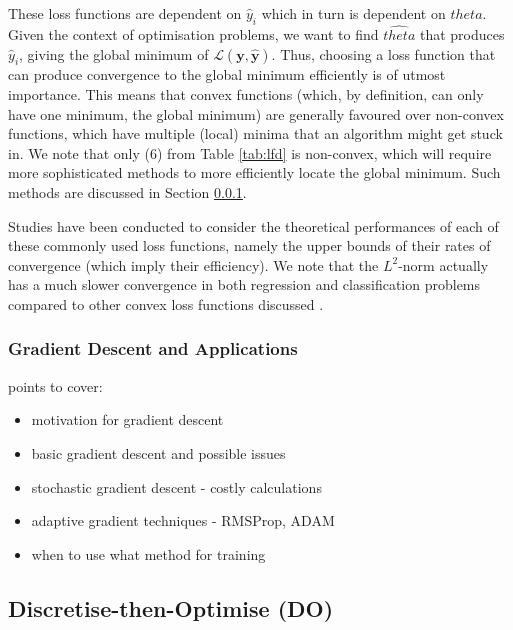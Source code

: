 \documentclass[a4paper,11pt,titlepage]{article}
\def\theta{theta}%
\theoremstyle{definition}
\theoremstyle{plain}
\theoremstyle{remark}
\begin{document}
These loss functions are dependent on $\hat{y}_i$ which in turn is dependent on $\theta$. Given the context of optimisation problems, we want to find $\hat{\theta}$ that produces $\hat{y}_i$, giving the global minimum of $\mathcal{L}(\mathbf{y}, \mathbf{\hat{y}})$. Thus, choosing a loss function that can produce convergence to the global minimum efficiently is of utmost importance. This means that convex functions (which, by definition, can only have one minimum, the global minimum) are generally favoured over non-convex functions, which have multiple (local) minima that an algorithm might get stuck in. We note that only (6) from Table \ref{tab:lfd} is non-convex, which will require more sophisticated methods to more efficiently locate the global minimum. Such methods are discussed in Section \ref{sec:gd}.

Studies have been conducted to consider the theoretical performances of each of these commonly used loss functions, namely the upper bounds of their rates of convergence (which imply their efficiency). We note that the $L^2$-norm actually has a much slower convergence in both regression and classification problems compared to other convex loss functions discussed \cite{Rosasco2004}.

\subsubsection{Gradient Descent and Applications}
\label{sec:gd}

points to cover:
\begin{itemize}
    \item motivation for gradient descent
    \item basic gradient descent and possible issues
    \item stochastic gradient descent - costly calculations
    \item adaptive gradient techniques - RMSProp, ADAM
    \item when to use what method for training
\end{itemize}

\subsection{Discretise-then-Optimise (DO)}
\label{sec:do}
\end{document}
